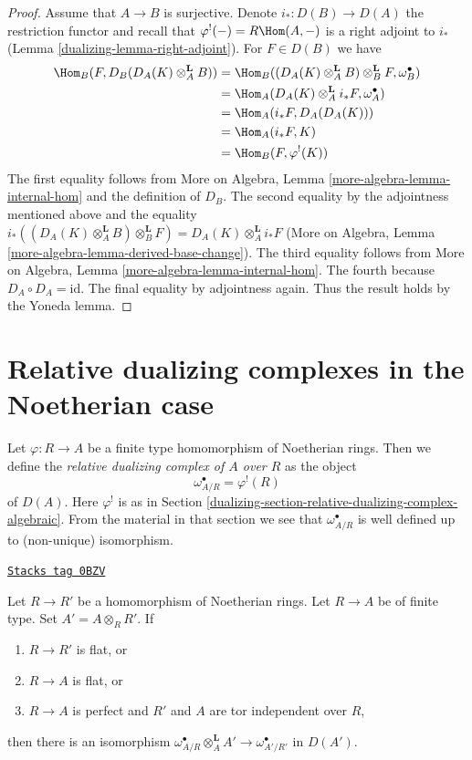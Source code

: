 \begin{proof}
\medskip\noindent
Assume that $A \to B$ is surjective. Denote $i_* : D(B) \to D(A)$
the restriction functor and recall that $\varphi^!(-) = R\Hom(A, -)$
is a right adjoint to $i_*$ (Lemma \ref{dualizing-lemma-right-adjoint}).
For $F \in D(B)$ we have
\begin{align*}
\Hom_B(F, D_B(D_A(K) \otimes_A^\mathbf{L} B))
& =
\Hom_B((D_A(K) \otimes_A^\mathbf{L} B) \otimes_B^\mathbf{L} F,
\omega_B^\bullet) \\
& =
\Hom_A(D_A(K) \otimes_A^\mathbf{L} i_*F, \omega_A^\bullet) \\
& =
\Hom_A(i_*F, D_A(D_A(K))) \\
& =
\Hom_A(i_*F, K) \\
& =
\Hom_B(F, \varphi^!(K))
\end{align*}
The first equality follows from More on Algebra, Lemma
\ref{more-algebra-lemma-internal-hom} and the definition
of $D_B$. The second equality by the adjointness mentioned
above and the equality
$i_*((D_A(K) \otimes_A^\mathbf{L} B) \otimes_B^\mathbf{L} F) =
D_A(K) \otimes_A^\mathbf{L} i_*F$
(More on Algebra, Lemma \ref{more-algebra-lemma-derived-base-change}).
The third equality follows from More on Algebra, Lemma
\ref{more-algebra-lemma-internal-hom}. The fourth because
$D_A \circ D_A = \text{id}$. The final equality by adjointness again.
Thus the result holds by the Yoneda lemma.
\end{proof}

\section{Relative dualizing complexes in the Noetherian case}
\label{dualizing-section-relative-dualizing-complexes-Noetherian}
Let $\varphi : R \to A$ be a finite type homomorphism of
Noetherian rings. Then we define the {\it relative dualizing
complex of $A$ over $R$} as the object
$$
\omega_{A/R}^\bullet = \varphi^!(R)
$$
of $D(A)$. Here $\varphi^!$ is as in
Section \ref{dualizing-section-relative-dualizing-complex-algebraic}.
From the material in that section we see that
$\omega_{A/R}^\bullet$ is well defined up to (non-unique) isomorphism.

\begin{lemma}
\label{dualizing-lemma-base-change-relative-algebraic}
\href{https://stacks.math.columbia.edu/tag/0BZV}{\texttt{Stacks tag 0BZV}}

Let $R \to R'$ be a homomorphism of Noetherian rings.
Let $R \to A$ be of finite type. Set $A' = A \otimes_R R'$. If
\begin{enumerate}
\item $R \to R'$ is flat, or
\item $R \to A$ is flat, or
\item $R \to A$ is perfect
and $R'$ and $A$ are tor independent over $R$,
\end{enumerate}
then there is an isomorphism
$\omega_{A/R}^\bullet \otimes_A^\mathbf{L} A' \to \omega^\bullet_{A'/R'}$
in $D(A')$.
\end{lemma}

